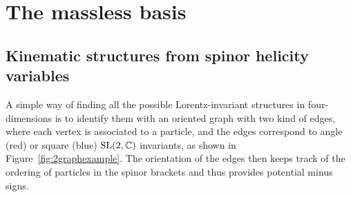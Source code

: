 \documentclass[aps,prd,nofootinbib,twocolumn,10pt]{revtex4-2}
\begin{document}
\section{The massless basis}


\subsection{Kinematic structures from spinor helicity variables}
\label{sec:kinematics}

A simple way of finding all the possible Lorentz-invariant structures in four-dimensions is to identify them with an oriented graph with two kind of edges, where each vertex is associated to a particle, and the edges correspond to angle (red) or square (blue) ${\rm SL}(2,\mathbb{C})$ invariants, as shown in Figure~\ref{fig:2graphexample}. The orientation of the edges then keeps track of the ordering of particles in the spinor brackets and thus provides potential minus signs.
\end{document}
